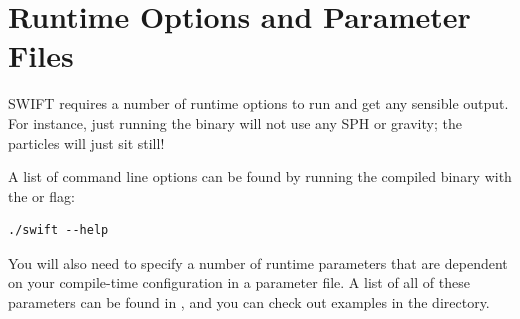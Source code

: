\section{Runtime Options and Parameter Files}

SWIFT requires a number of runtime options to run and get any sensible output.
For instance, just running the  binary will not use any SPH
or gravity; the particles will just sit still!

A list of  command line options can be found by running the compiled binary with
the  or  flag:

\begin{lstlisting}[style=codeblock]
   ./swift --help
\end{lstlisting}


You will also need to specify a number of runtime parameters that are dependent
on your compile-time configuration in a parameter file. A list of all of these
parameters can be found in , and you can check
out examples in the  directory.

